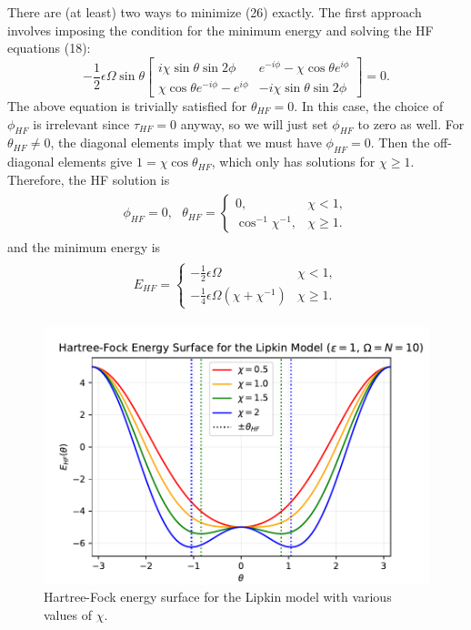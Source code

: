 \documentclass[prb,aps,twocolumn,showpacs,10pt]{revtex4-2}
\begin{document}
There are (at least) two ways to minimize (26) exactly. The first approach involves imposing the condition for the minimum energy and solving the HF equations (18):
\begin{equation}
-\frac{1}{2} \epsilon \Omega \sin \theta
\begin{bmatrix}
i \chi \sin \theta \sin 2 \phi & e^{-i\phi} - \chi \cos \theta e^{i\phi} \\
\chi \cos \theta e^{-i\phi} - e^{i\phi} & - i \chi \sin \theta \sin 2\phi
\end{bmatrix}
=0.
\end{equation}
The above equation is trivially satisfied for $\theta_{HF} = 0$. In this case, the choice of $\phi_{HF}$ is irrelevant since $\tau_{HF}=0$ anyway, so we will just set $\phi_{HF}$ to zero as well. For $\theta_{HF} \neq 0$, the diagonal elements imply that we must have $\phi_{HF}=0$. Then the off-diagonal elements give $1=\chi \cos \theta_{HF}$, which only has solutions for $\chi \geq 1$. Therefore, the HF solution is
\begin{align}
\begin{split}
\phi_{HF} = 0, \ \ \
\theta_{HF} = \begin{cases} 
      0, & \chi < 1,\\
      \cos^{-1} \chi^{-1}, & \chi \geq 1.
   \end{cases}
\end{split}
\end{align}
and the minimum energy is
\begin{align}
\begin{split}
E_{HF} = \begin{cases} 
      -\frac{1}{2}\epsilon \Omega & \chi < 1,\\
       -\frac{1}{4}\epsilon \Omega (\chi + \chi^{-1}) & \chi \geq 1.
   \end{cases}
\end{split}
\end{align}

\begin{figure}
  \includegraphics[width=\linewidth]{../figures/plot_hf_surface.pdf}
  \caption{Hartree-Fock energy surface for the Lipkin model with various values of $\chi$.}
\end{figure}
\end{document}
